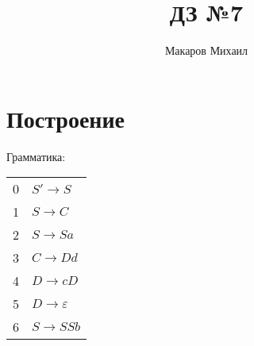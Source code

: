 \documentclass{article}
\title{ДЗ №7}
\author{Макаров Михаил}
\date{}
\begin{document}
	\maketitle
	\section{Построение}
    Грамматика:\\
    \begin{tabular}{c|l}
    0 & $S' \to S$ \\
    1 & $S \to C$ \\
    2 & $S \to Sa$ \\
    3 & $C \to Dd$ \\
    4 & $D \to cD$ \\
    5 & $D \to \varepsilon$ \\
    6 & $S \to SSb$ \\
    \end{tabular}
\end{document}
